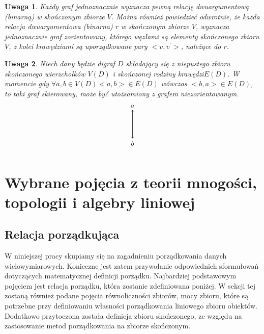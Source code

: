 \documentclass[12pt,a4paper]{report}
\newtheorem{uwaga}{Uwaga}
\begin{document}
\begin{uwaga}
Każdy graf jednoznacznie wyznacza pewną relację dwuargumentową (binarną) w skończonym zbiorze $V$. Można również powiedzieć odwrotnie, że każda relacja dwuargumentowa (binarna) $r$ w skończonym zbiorze $V$, wyznacza jednoznacznie graf zorientowany, którego węzłami są elementy skończonego zbioru $V$, z kolei krawędziami są uporządkowane pary $<v,v^{'}>$, należące do $r$. 
\end{uwaga}

\begin{uwaga}
Niech dany będzie digraf $D$ składający się z niepustego zbioru skończonego wierzchołków $V(D)$ i skończonej rodziny krawędzi$E(D)$. W momencie gdy $\forall{a,b} \in V(D)  <a,b> \in E(D)$ wówczas $<b,a> \in E(D)$, to taki graf skierowany, może być utożsamiony z grafem niezorientowanym. 
$$
\begin{tikzpicture}[scale=.7]
\draw [->] (0,-2) --(0,0) ;
 \draw node(a) at (0,0.25) {$a$};
 \draw [->] (0,0) --(0,-2); 
 \draw node (b) at (0, -2.35) {$b$};
\end{tikzpicture}
$$

\end{uwaga}






\section{Wybrane pojęcia z teorii mnogości, topologii i algebry liniowej}\label{teoria mnogosci}
\subsection{Relacja porządkująca}


W niniejszej pracy skupiamy się na zagadnieniu porządkowania danych wielowymiarowych. Konieczne jest zatem przywołanie odpowiednich sformułowań dotyczących matematycznej definicji porządku. Najbardziej podstawowym pojęciem jest relacja porządku, która zostanie zdefiniowana poniżej. W sekcji tej zostaną również podane pojęcia równoliczności zbiorów, mocy zbioru, które są potrzebne przy definiowaniu własności porządkowania liniowego zbioru obiektów. Dodatkowo przytoczona została definicja zbioru skończonego, ze względu na zastosowanie metod porządkowania na zbiorze skończonym.
\end{document}

